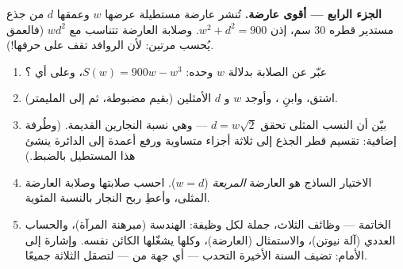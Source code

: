 \begin{problem}
\medskip
\noindent\textbf{الجزء الرابع --- أقوى عارضة.}
تُنشر عارضة مستطيلة عرضها $w$ وعمقها $d$ من
جذع مستدير قطره $30$ سم، إذن $w^2 + d^2 = 900$. وصلابة
العارضة تتناسب مع $w d^2$ (فالعمق يُحسب مرتين:
لأن الروافد تقف على حرفها!).
\begin{enumerate}[resume]
  \item عبّر عن الصلابة بدلالة $w$ وحده:
        $S(w) = 900w - w^3$، وعلى أي ؟
  \item اشتق، وابنِ ، وأوجد
        $w$ و $d$ الأمثلين (بقيم مضبوطة، ثم إلى
        المليمتر).
  \item بيّن أن النسب المثلى تحقق
        $d = w\sqrt2$ --- وهي نسبة النجارين القديمة. (وطُرفة
        إضافية: تقسيم قطر الجذع إلى ثلاثة أجزاء متساوية
        ورفع أعمدة إلى الدائرة ينشئ
        هذا المستطيل بالضبط.)
  \item الاختيار الساذج هو العارضة \emph{المربعة}
        ($w = d$). احسب صلابتها وصلابة العارضة
        المثلى، وأعطِ ربح النجار بالنسبة المئوية.
  \item الخاتمة --- وظائف  الثلاث، جملة لكل وظيفة:
        الهندسة (مبرهنة المرآة)، والحساب العددي (آلة
        نيوتن)، والاستمثال (العارضة)، وكلها يشغّلها
        الكائن نفسه. وإشارة إلى الأمام: تضيف السنة الأخيرة التحدب
        --- أي جهة  من  --- لتصقل الثلاثة جميعًا.
\end{enumerate}
\end{problem}
